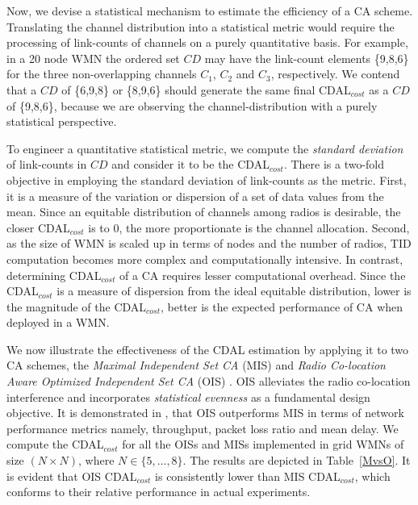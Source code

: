 \documentclass[conference]{IEEEtran}
\begin{document}
Now, we devise a statistical mechanism to estimate the efficiency of a CA scheme. Translating the channel distribution into a statistical metric would require the processing of link-counts of channels on a purely quantitative basis. For example, in a 20 node WMN the ordered set $CD$ may have the link-count elements \{9,8,6\} for the three non-overlapping channels $C_1$, $C_2$ and $C_3$, respectively. We contend that a $CD$ of \{6,9,8\} or \{8,9,6\} should generate the same final CDAL$_{cost}$ as a $CD$ of \{9,8,6\}, because we are observing the channel-distribution with a purely statistical perspective. 

To engineer a quantitative statistical metric, we compute the \textit{standard deviation} of link-counts in $CD$ and consider it to be the CDAL$_{cost}$. There is a two-fold objective in employing the standard deviation of link-counts as the metric. First, it is a measure of the variation or dispersion of a set of data values from the mean. Since an equitable distribution of channels among radios is desirable, the closer CDAL$_{cost}$ is to 0, the more proportionate is the channel allocation. Second, as the size of WMN is scaled up in terms of nodes and the number of radios, TID computation becomes more complex and computationally intensive. In contrast, determining CDAL$_{cost}$ of a CA requires lesser computational overhead. Since the CDAL$_{cost}$ is a measure of dispersion from the ideal equitable distribution, lower is the magnitude of the CDAL$_{cost}$, better is the expected performance of CA when deployed in a WMN. 

We now illustrate the effectiveness of the CDAL estimation by applying it to two CA schemes, the \textit{Maximal Independent Set CA} (MIS) \cite{24Aizaz} and \textit{Radio Co-location Aware Optimized Independent Set CA} (OIS) \cite{Manas2}. OIS alleviates the radio co-location interference and incorporates \textit{statistical evenness} as a fundamental design objective. It is demonstrated in \cite{Manas2}, that OIS  outperforms MIS in terms of network performance metrics namely, throughput, packet loss ratio and mean delay. We compute the  CDAL$_{cost}$ for all the OISs and MISs implemented in grid WMNs of size $(N\times N)$, where $N\in \{5,\ldots,8\}$. The results are depicted in Table~\ref{MvsO}. It is evident that OIS CDAL$_{cost}$ is consistently lower than MIS CDAL$_{cost}$, which conforms to their relative performance in actual experiments. 
\end{document}
